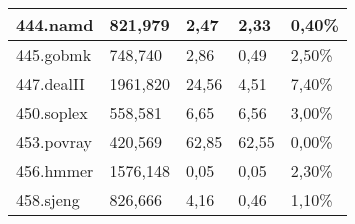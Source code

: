 \begin{table}[]
\begin{tabular}{|l|l|l|l|l|}
		444.namd           & 821,979                                                                          & 2,47                                                                & 2,33                                                                            & 0,40\%                                                                         \\ \hline
		445.gobmk          & 748,740                                                                          & 2,86                                                                & 0,49                                                                            & 2,50\%                                                                         \\ \hline
		447.dealII         & 1961,820                                                                         & 24,56                                                               & 4,51                                                                            & 7,40\%                                                                         \\ \hline
		450.soplex         & 558,581                                                                          & 6,65                                                                & 6,56                                                                            & 3,00\%                                                                         \\ \hline
		453.povray         & 420,569                                                                          & 62,85                                                               & 62,55                                                                           & 0,00\%                                                                         \\ \hline
		456.hmmer          & 1576,148                                                                         & 0,05                                                                & 0,05                                                                            & 2,30\%                                                                         \\ \hline
		458.sjeng          & 826,666                                                                          & 4,16                                                                & 0,46                                                                            & 1,10\%                                                                         \\ \hline

\end{tabular}
\end{table}
